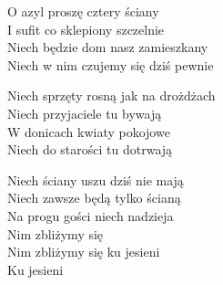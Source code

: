 \begin{text}
    O azyl proszę cztery ściany\\
    I sufit co sklepiony szczelnie\\
    Niech będzie dom nasz zamieszkany\\
    Niech w nim czujemy się dziś pewnie

    Niech sprzęty rosną jak na drożdżach\\
    Niech przyjaciele tu bywają\\
    W donicach kwiaty pokojowe\\
    Niech do starości tu dotrwają

    Niech ściany uszu dziś nie mają\\
    Niech zawsze będą tylko ścianą\\
    Na progu gości niech nadzieja\\
    Nim zbliżymy się\\
    Nim zbliżymy się ku jesieni\\
    Ku jesieni
\end{text}
\begin{chord}

\end{chord}